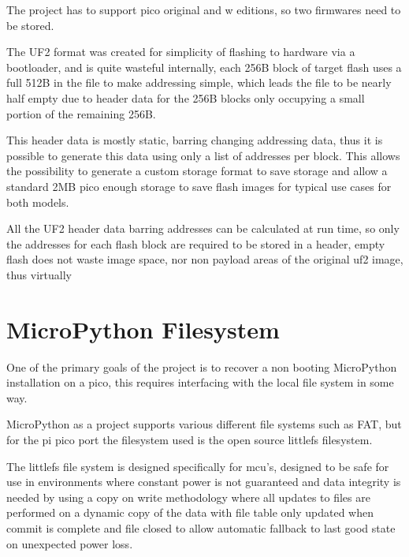 The project has to support pico original and w editions, so two firmwares need to be stored.

The UF2 format was created for simplicity of flashing to hardware via a bootloader, and is quite wasteful internally, each 256B block of target flash uses a full 512B in the file to make addressing simple, which leads the file to be nearly half empty due to header data for the 256B blocks only occupying a small portion of the remaining 256B.

This header data is mostly static, barring changing addressing data, thus it is possible to generate this data using only a list of addresses per block. This allows the possibility to generate a custom storage format to save storage and allow a standard 2MB pico enough storage to save flash images for typical use cases for both models.

All the UF2 header data barring addresses can be calculated at run time, so only the addresses for each flash block are required to be stored in a header, empty flash does not waste image space, nor non payload areas of the original uf2 image, thus virtually

\clearpage
\section{MicroPython Filesystem}
One of the primary goals of the project is to recover a non booting MicroPython installation on a pico, this requires interfacing with the local file system in some way.

MicroPython as a project supports various different file systems such as FAT, but for the pi pico port the filesystem used is the open source littlefs filesystem\cite{MicroPythonProject2023}.

The littlefs file system is designed specifically for \gls{mcu}'s, designed to be safe for use in environments where constant power is not guaranteed and data integrity is needed by using a copy on write methodology where all updates to files are performed on a dynamic copy of the data with file table only updated when commit is complete and file closed to allow automatic fallback to last good state on unexpected power loss.





